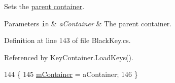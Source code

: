 Sets the \hyperlink{group___doc_key_contain}{parent container}. 


\begin{DoxyParams}[1]{Parameters}
\mbox{\tt in}  & {\em a\+Container} & The parent container. \\
\hline
\end{DoxyParams}


Definition at line 143 of file Black\+Key.\+cs.



Referenced by Key\+Container.\+Load\+Keys().


\begin{DoxyCode}
144     \{
145         \hyperlink{group___black_key_priv_var_ga11beacc28de4d17e70c4188bfdc2bdf0}{mContainer} = aContainer;
146     \}
\end{DoxyCode}

